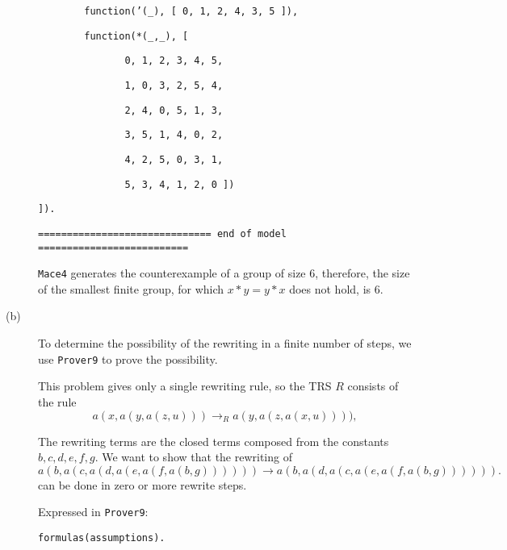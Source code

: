 \begin{description}
{\tt \ \ \ \ \ \ \ \ function('(\_), [ 0, 1, 2, 4, 3, 5 ]),}

{\tt \ \ \ \ \ \ \ \ function(*(\_,\_), [}

{\tt \	\	\	\ \ \ \	\	\	\ \ \ \ \ \ 0, 1, 2, 3, 4, 5,}

{\tt \	\	\	\ \ \ \	\	\	\ \ \ \ \ \ 1, 0, 3, 2, 5, 4,}

{\tt \	\	\	\ \ \ \	\	\	\ \ \ \ \ \ 2, 4, 0, 5, 1, 3,}
	
{\tt \	\	\	\ \ \ \	\	\	\ \ \ \ \ \ 3, 5, 1, 4, 0, 2,}

{\tt \	\	\	\ \ \ \	\	\	\ \ \ \ \ \ 4, 2, 5, 0, 3, 1,}

{\tt \	\	\	\ \ \ \	\	\	\ \ \ \ \ \ 5, 3, 4, 1, 2, 0 ])}

{\tt ]).}

{\tt ============================== end of model ==========================}

\vspace{3mm}

{\tt Mace4} generates the counterexample of a group of size 6, therefore, the size of the smallest finite group, for which $ x \ast y = y \ast x $ does not hold, is 6.

  \item[(b)] To determine the possibility of the rewriting in a finite number of steps, we use {\tt Prover9} to prove the possibility.

  This problem gives only a single rewriting rule, so the TRS $R$ consists of the rule  \[ a(x, a(y, a(z, u))) \rightarrow_{R} a(y, a(z, a(x, u)))), \]

  The rewriting terms are the closed terms composed from the constants $b, c, d, e, f, g$. We want to show that the rewriting of \[ a(b, a(c, a(d, a(e, a(f, a(b, g)))))) \rightarrow a(b, a(d, a(c, a(e, a(f, a(b, g)))))). \] can be done in zero or more rewrite steps.



      Expressed in {\tt Prover9}:

\vspace{2mm}

{\footnotesize

{\tt formulas(assumptions).}



}
\end{description}
